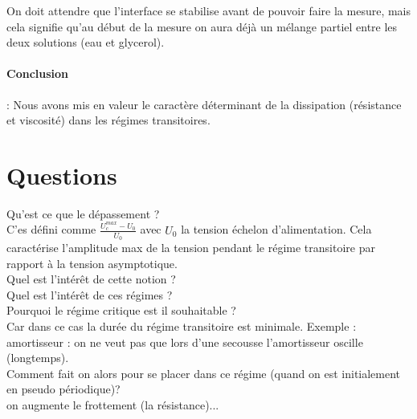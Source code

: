 \documentclass[12pt,prb,aps,epsf]{article}
\begin{document}
On doit attendre que l'interface se stabilise avant de pouvoir faire la mesure, mais cela signifie qu'au début de la mesure on aura déjà un mélange partiel entre les deux solutions (eau et glycerol).

\paragraph{Conclusion}: Nous avons mis en valeur le caractère déterminant de la dissipation (résistance et viscosité) dans les régimes transitoires.

\section*{Questions}
Qu'est ce que le dépassement ?\\
C'es défini comme $\frac{U_c^{max}-U_0}{U_0}$ avec $U_0$ la tension échelon d'alimentation. Cela caractérise l'amplitude max de la tension pendant le régime transitoire par rapport à la tension asymptotique.\\

Quel est l'intérêt de cette notion ?\\

Quel est l'intérêt de ces régimes ?\\

Pourquoi le régime critique est il souhaitable ?\\
Car dans ce cas la durée du régime transitoire est minimale. Exemple : amortisseur : on ne veut pas que lors d'une secousse l'amortisseur oscille (longtemps).\\

Comment fait on alors pour se placer dans ce régime (quand on est initialement en pseudo périodique)?\\
on augmente le frottement (la résistance)...
\end{document}
